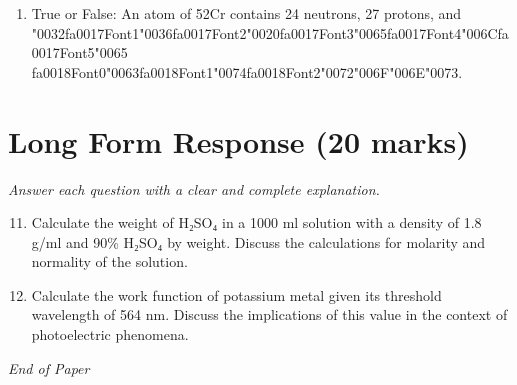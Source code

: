 \documentclass[12pt]{article}
\begin{document}
\begin{enumerate}[label=\arabic*.]
\item True or False: An atom of 52Cr contains 24 neutrons, 27 protons, and {\char"0032}{\csname fa0017Font1\endcsname\char"0036}{\csname fa0017Font2\endcsname\char"0020}{\csname fa0017Font3\endcsname\char"0065}{\csname fa0017Font4\endcsname\char"006C}{\csname fa0017Font5\endcsname\char"0065} {\csname fa0018Font0\endcsname\char"0063}{\csname fa0018Font1\endcsname\char"0074}{\csname fa0018Font2\endcsname\char"0072}{\char"006F}{\char"006E}{\char"0073}.
\end{enumerate}

\section*{Long Form Response (20 marks)}
\textit{Answer each question with a clear and complete explanation.}
\begin{enumerate}[label=\arabic*.]
\setcounter{enumi}{10}
\item Calculate the weight of H₂SO₄ in a 1000 ml solution with a density of 1.8 g/ml and 90\%
H₂SO₄ by weight. Discuss the calculations for molarity and normality of the solution.
\item Calculate the work function of potassium metal given its threshold wavelength of 564 nm.
Discuss the implications of this value in the context of photoelectric phenomena.
\end{enumerate}

\vfill
\noindent\textit{End of Paper}
\end{document}
